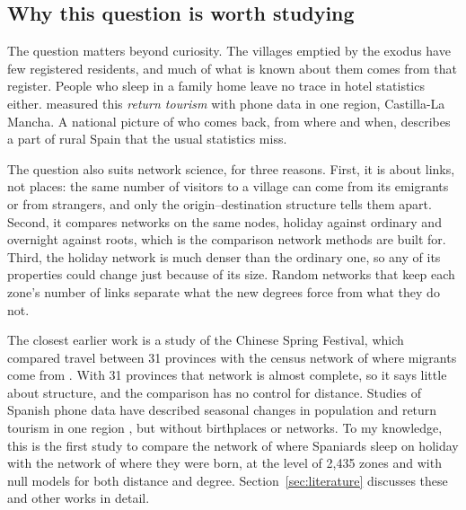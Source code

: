 \subsection{Why this question is worth studying}

The question matters beyond curiosity. The villages emptied by the exodus have few registered residents, and much of what is known about them comes from that register. People who sleep in a family home leave no trace in hotel statistics either. \citet{garciagonzalez2024retorno} measured this \emph{return tourism} with phone data in one region, Castilla-La Mancha. A national picture of who comes back, from where and when, describes a part of rural Spain that the usual statistics miss.

The question also suits network science, for three reasons. First, it is about links, not places: the same number of visitors to a village can come from its emigrants or from strangers, and only the origin--destination structure tells them apart. Second, it compares networks on the same nodes, holiday against ordinary and overnight against roots, which is the comparison network methods are built for. Third, the holiday network is much denser than the ordinary one, so any of its properties could change just because of its size. Random networks that keep each zone's number of links separate what the new degrees force from what they do not.

The closest earlier work is a study of the Chinese Spring Festival, which compared travel between 31 provinces with the census network of where migrants come from \citep{li2016spring}. With 31 provinces that network is almost complete, so it says little about structure, and the comparison has no control for distance. Studies of Spanish phone data have described seasonal changes in population \citep{garzon2026heritage} and return tourism in one region \citep{garciagonzalez2024retorno}, but without birthplaces or networks. To my knowledge, this is the first study to compare the network of where Spaniards sleep on holiday with the network of where they were born, at the level of 2,435 zones and with null models for both distance and degree. Section~\ref{sec:literature} discusses these and other works in detail.
